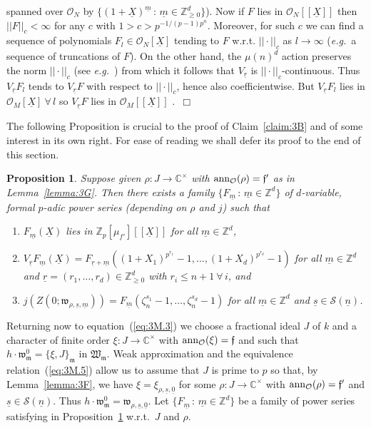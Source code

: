 \documentclass[12pt]{article}
\newtheorem{prop}{Proposition}[section]
\newcounter{rem}[section]%
\newcommand{\bbC}{\ensuremath{\mathbb{C}}}
\newcommand{\bbZ}{\ensuremath{\mathbb{Z}}}
\newcommand{\cO}{\ensuremath{\mathcal{O}}}
\newcommand{\cS}{\ensuremath{\mathcal{S}}}
\newcommand{\eg}{\emph{e.g.}}
\newcommand{\ePf}{\hspace*{\fill}~$\Box$\vertsp\par}%
\newcommand{\ff}{\ensuremath{\mathfrak{f}}}
\newcommand{\fm}{\ensuremath{\mathfrak{m}}}
\newcommand{\fw}{\ensuremath{\mathfrak{w}}}
\newcommand{\fW}{\ensuremath{\mathfrak{W}}}
\newcommand{\refeq}[1]{~(\ref{eq:#1})}
\newcommand{\rem}{\refstepcounter{rem}\noindent{\sc Remark \therem}}%
\renewcommand{\therem}{\thesection.\arabic{rem}}
\newcommand{\vertsp}{\vspace{1ex}}
\newcommand{\um}{\ensuremath{{\underline{m}}}}
\newcommand{\un}{\ensuremath{{\underline{n}}}}
\newcommand{\ur}{\ensuremath{{\underline{r}}}}
\newcommand{\us}{\ensuremath{{\underline{s}}}}
\newcommand{\uX}{\ensuremath{{\underline{X}}}}
\newcommand{\uzero}{\ensuremath{{\underline{0}}}}
\begin{document}
spanned over
$\cO_N$ by $\{(1+\uX)^{\um}\,:\,\um\in\bbZ_{\geq 0}^d\}$).
Now if $F$ lies in $\cO_N[[\uX]]$ then $||F||_c<\infty$
for any $c$ with
$1>c>p^{-1/(p-1)p^n}$. Moreover, for such $c$ we can find a sequence of
polynomials
$F_l\in\cO_N[\uX]$ tending to $F$ w.r.t. $||\cdot||_c$
as $l\rightarrow\infty$ (\eg\ a sequence of truncations of $F$).
On the other hand, the $\mu(n)^d$ action preserves the norm $||\cdot||_c$
(see \eg\ \cite[Sec. 3.2]{p-adic lims}) from which
it follows that $V_\ur$ is $||\cdot||_c$-continuous.
Thus $V_\ur F_l$ tends to $V_\ur F$ with respect to $||\cdot||_c$,
hence also coefficientwise. But $V_\ur F_l$ lies in
$\cO_M[\uX]\ \forall\,l$ so
$V_\ur F$ lies in $\cO_M[[\uX]]$ .\ePf
\noindent The following Proposition is crucial to the proof of
Claim~\ref{claim:3B} and of some interest in its own right. For ease of
reading we shall defer its proof to the end of this section.
\begin{prop}\label{prop:3B}
Suppose given $\rho: J\rightarrow\bbC^\times$ with
${\rm ann}_\cO(\rho)=\ff'$ as in Lemma~\ref{lemma:3G}. Then
there exists a family $\{F_{\um}\,:\,\um\in\bbZ^d\}$ of
$d$-variable, formal $p$-adic power series (depending on $\rho$ and
$j$) such that
\begin{enumerate}
\item\label{A'} $F_{\um}(\uX)$ lies in $\bbZ_p[\mu_{f'}][[\uX]]$
for all $\um\in\bbZ^d$,
\item\label{C'} $V_\ur F_{\um}(\uX)=
F_{\ur+\um}((1+X_1)^{p^{r_1}}-1,\ldots,(1+X_d)^{p^{r_d}}-1)$
for all $\um\in\bbZ^d$ and $\ur=(r_1,\ldots,r_d)\in\bbZ_{\geq 0}^d$ with
$r_i\leq n+1\ \forall\,i$, and
\item\label{B'} $j(Z(0;\fw_{\rho,\us,\um}))=
F_{\um}(\zeta_n^{s_1}-1,\ldots,\zeta_n^{s_d}-1)$
for all $\um\in\bbZ^d$ and $\us\in\cS(\un)$.
\end{enumerate}
\end{prop}
Returning now to equation\refeq{3M.3} we choose a fractional
ideal $J$ of $k$ and a character of finite order $\xi:J\rightarrow\bbC^\times$
with ${\rm ann}_\cO(\xi)=\ff$ and such that
$h\cdot\fw_\fm^0=\{\xi,J\}_\fm$ in $\fW_\fm$. Weak approximation
and the equivalence
relation\refeq{3M.5} allow us to assume
that $J$ is prime to $p$ so that, by Lemma~\ref{lemma:3F}, we have
$\xi=\xi_{\rho,\us,\uzero}$ for some
$\rho: J\rightarrow\bbC^\times$ with ${\rm ann}_\cO(\rho)=\ff'$
and $\us\in\cS(\un)$. Thus $h\cdot\fw_\fm^0=\fw_{\rho,\us,\uzero}$.
Let $\{F_{\um}\,:\,\um\in\bbZ^d\}$ be a family of power
series satisfying in Proposition~\ref{prop:3B} w.r.t.\ $J$ and $\rho$.
\end{document}
